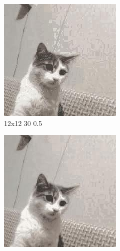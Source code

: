 \documentclass[12pt,a4paper]{article}
\begin{document}
\begin{figure}[H]
\medskip
\begin{subfigure}{0.25\textwidth}
  \includegraphics[width=\linewidth]{images/small/12-12-30-05}
  \caption{12x12 30 0.5}
  \label{fig:6}
\end{subfigure}\hfil %
\begin{subfigure}{0.25\textwidth}
  \includegraphics[width=\linewidth]{images/small/16-16-30-05}

\end{subfigure}
\end{figure}
\end{document}
